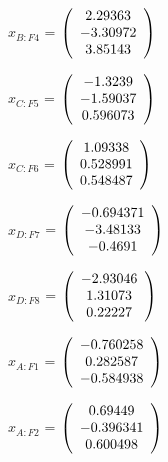 \begin{description}
$x_{B:F4}$ = $\left( \begin{array} {ccc}    2.29363 \\   -3.30972 \\    3.85143 
\end{array} \right)\\ \\$

$x_{C:F5}$ = $\left( \begin{array} {ccc}    -1.3239 \\   -1.59037 \\   0.596073 
\end{array} \right)\\ \\$

$x_{C:F6}$ = $\left( \begin{array} {ccc}    1.09338 \\   0.528991 \\   0.548487 
\end{array} \right)\\ \\$

$x_{D:F7}$ = $\left( \begin{array} {ccc}  -0.694371 \\   -3.48133 \\    -0.4691 
\end{array} \right)\\ \\$

$x_{D:F8}$ = $\left( \begin{array} {ccc}   -2.93046 \\    1.31073 \\    0.22227 
\end{array} \right)\\ \\$

$\hat{x}_{A:F1}$ = $\left( \begin{array} {ccc}  -0.760258 \\   0.282587 \\  -0.584938 
\end{array} \right)\\ \\$

$\hat{x}_{A:F2}$ = $\left( \begin{array} {ccc}    0.69449 \\  -0.396341 \\   0.600498 
\end{array} \right)\\ \\$


\end{description}
